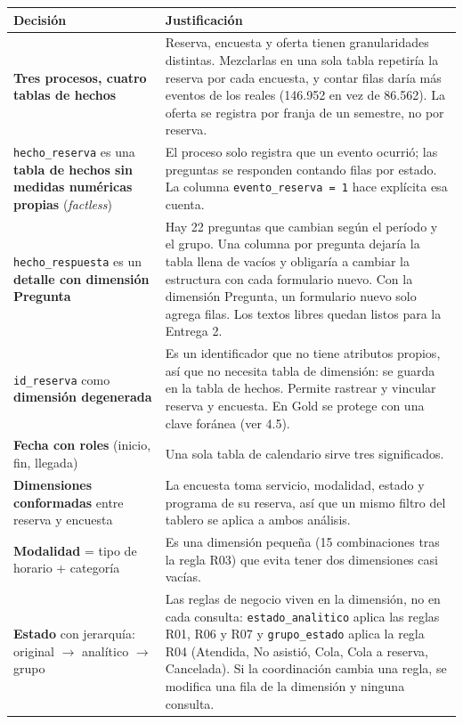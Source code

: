 \documentclass[11pt,letterpaper]{article}
\begin{document}
\begingroup\small\setlength{\tabcolsep}{4pt}\renewcommand{\arraystretch}{1.15}
\begin{longtable}{>{\raggedright\arraybackslash}p{}>{\raggedright\arraybackslash}p{}}
\toprule
\textbf{Decisión} & \textbf{Justificación} \\
\midrule
\endhead
\textbf{Tres procesos, cuatro tablas de hechos} & Reserva, encuesta y oferta tienen granularidades distintas. Mezclarlas en una sola tabla repetiría la reserva por cada encuesta, y contar filas daría más eventos de los reales (146.952 en vez de 86.562). La oferta se registra por franja de un semestre, no por reserva. \\
\texttt{hecho\_\allowbreak{}reserva} es una \textbf{tabla de hechos sin medidas numéricas propias} (\emph{factless}) & El proceso solo registra que un evento ocurrió; las preguntas se responden contando filas por estado. La columna \texttt{evento\_\allowbreak{}reserva = 1} hace explícita esa cuenta. \\
\texttt{hecho\_\allowbreak{}respuesta} es un \textbf{detalle con dimensión Pregunta} & Hay 22 preguntas que cambian según el período y el grupo. Una columna por pregunta dejaría la tabla llena de vacíos y obligaría a cambiar la estructura con cada formulario nuevo. Con la dimensión Pregunta, un formulario nuevo solo agrega filas. Los textos libres quedan listos para la Entrega 2. \\
\texttt{id\_\allowbreak{}reserva} como \textbf{dimensión degenerada} & Es un identificador que no tiene atributos propios, así que no necesita tabla de dimensión: se guarda en la tabla de hechos. Permite rastrear y vincular reserva y encuesta. En Gold se protege con una clave foránea (ver 4.5). \\
\textbf{Fecha con roles} (inicio, fin, llegada) & Una sola tabla de calendario sirve tres significados. \\
\textbf{Dimensiones conformadas} entre reserva y encuesta & La encuesta toma servicio, modalidad, estado y programa de su reserva, así que un mismo filtro del tablero se aplica a ambos análisis. \\
\textbf{Modalidad} = tipo de horario + categoría & Es una dimensión pequeña (15 combinaciones tras la regla R03) que evita tener dos dimensiones casi vacías. \\
\textbf{Estado} con jerarquía: original $\rightarrow$ analítico $\rightarrow$ grupo & Las reglas de negocio viven en la dimensión, no en cada consulta: \texttt{estado\_\allowbreak{}analitico} aplica las reglas R01, R06 y R07 y \texttt{grupo\_\allowbreak{}estado} aplica la regla R04 (Atendida, No asistió, Cola, Cola a reserva, Cancelada). Si la coordinación cambia una regla, se modifica una fila de la dimensión y ninguna consulta. \\

\end{longtable}
\end{document}
